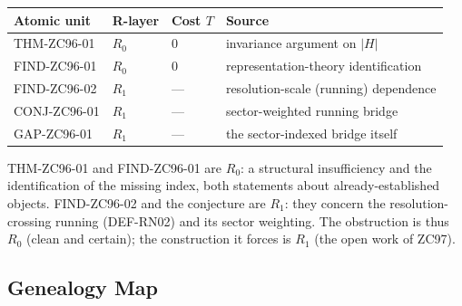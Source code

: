 \documentclass[12pt, a4paper]{article}
\begin{document}
\begin{layerbox}[title={R-Layer Assignments for ZC96}]
{\small\renewcommand{\arraystretch}{1.25}
\begin{center}
\begin{tabular}{@{}llll@{}}
\toprule
Atomic unit & R-layer & Cost $T$ & Source \\
\midrule
THM-ZC96-01  & $R_0$ & $0$ & invariance argument on $|H|$ \\
FIND-ZC96-01 & $R_0$ & $0$ & representation-theory identification \\
FIND-ZC96-02 & $R_1$ & --- & resolution-scale (running) dependence \\
CONJ-ZC96-01 & $R_1$ & --- & sector-weighted running bridge \\
GAP-ZC96-01  & $R_1$ & --- & the sector-indexed bridge itself \\
\bottomrule
\end{tabular}
\end{center}}
THM-ZC96-01 and FIND-ZC96-01 are $R_0$: a structural insufficiency and the
identification of the missing index, both statements about already-established
objects. FIND-ZC96-02 and the conjecture are $R_1$: they concern the
resolution-crossing running (DEF-RN02) and its sector weighting. The obstruction
is thus $R_0$ (clean and certain); the construction it forces is $R_1$ (the open
work of ZC97).
\end{layerbox}

\subsection{Genealogy Map}
\label{sec:genealogy-zc96}
\end{document}
